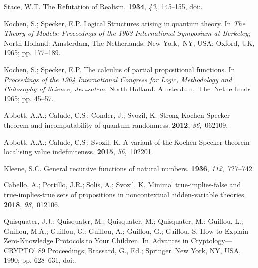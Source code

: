 \begin{thebibliography}{999}
Stace, W.T.
\newblock The Refutation of Realism.
 {\bf 1934}, {\em 43},~145--155,
\newblock
 doi:{\href{https://doi.org/10.1093/mind/XLIII.170.145}{}}.

Kochen, S.; Specker, E.P.
\newblock Logical Structures arising in quantum theory.
\newblock In \emph{The Theory of Models: Proceedings of the 1963 International
 Symposium at Berkeley}; North Holland: Amsterdam, The Netherlands; New York,~NY, USA; Oxford, UK, 1965; pp.
 177--189.

Kochen, S.; Specker, E.P.
\newblock The calculus of partial propositional functions.
\newblock In \emph{Proceedings of the 1964 International Congress for Logic,
 Methodology and Philosophy of Science, Jerusalem}; North Holland: Amsterdam,~The~Netherlands
 1965; pp. 45--57.

Abbott, A.A.; Calude, C.S.; Conder, J.; Svozil, K.
\newblock Strong {K}ochen-{S}pecker theorem and incomputability of quantum
 randomness.
 {\bf 2012}, {\em 86},~062109.

Abbott, A.A.; Calude, C.S.; Svozil, K.
\newblock A variant of the {K}ochen-{S}pecker theorem localising value
 indefiniteness.
 {\bf 2015}, {\em
 56},~102201.

Kleene, S.C.
\newblock General recursive functions of natural numbers.
 {\bf 1936}, {\em 112},~727--742.

Cabello, A.; Portillo, J.R.; Sol\'{i}s, A.; Svozil, K.
\newblock Minimal true-implies-false and true-implies-true sets of propositions
 in noncontextual hidden-variable theories.
 {\bf 2018}, {\em 98},~012106.

Quisquater, J.J.; Quisquater, M.; Quisquater, M.; Quisquater, M.; Guillou, L.;
 Guillou, M.A.; Guillou, G.; Guillou, A.; Guillou, G.; Guillou, S.
\newblock How to Explain Zero-Knowledge Protocols to Your Children.
\newblock In~Advances in Cryptology---CRYPTO' 89 Proceedings; Brassard, G., Ed.;
 Springer: New York, NY, USA, 1990; pp. 628--631,
\newblock
 doi:{\href{https://doi.org/10.1007/0-387-34805-0\_60}{}}.


\end{thebibliography}
